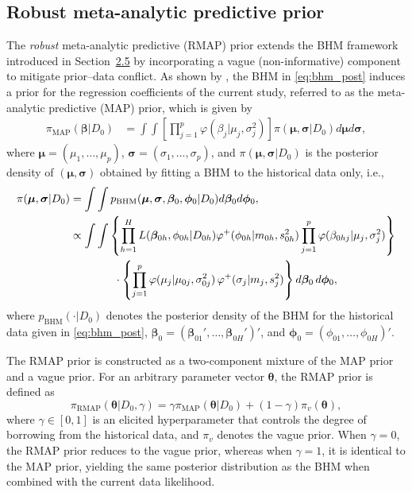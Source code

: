 \subsection{Robust meta-analytic predictive prior}
\label{sec:RMAP}

The \emph{robust} meta-analytic predictive (RMAP) prior \citep{schmidli2014robust} extends the BHM framework introduced in Section~\hyperref[sec:bhm]{2.5} by incorporating a vague (non-informative) component to mitigate prior–data conflict. As shown by \citet{schmidli2014robust}, the BHM in \eqref{eq:bhm_post} induces a prior for the regression coefficients of the current study, referred to as the meta-analytic predictive (MAP) prior, which is given by
\begin{align}
    \pi_{\text{MAP}}(\bm{\beta} | D_0)
        &= \int \int \left[\prod_{j=1}^p \varphi(\beta_j | \mu_j, \sigma_j^2) \right] \pi(\bm{\mu}, \bm{\sigma} | D_0) d\bm{\mu} d\bm{\sigma},
        \label{eq:map}
\end{align}
where $\bm{\mu} = (\mu_1, \ldots, \mu_p)$, $\bm{\sigma} = (\sigma_1, \ldots, \sigma_p)$, and $\pi(\bm{\mu}, \bm{\sigma} | D_0)$ is the posterior density of $(\bm{\mu}, \bm{\sigma})$ obtained by fitting a BHM to the historical data only, i.e.,
\begin{align}
    \pi(\bm{\mu}, \bm{\sigma} | D_0) &= 
    \int \int p_{\text{BHM}}(\bm{\mu}, \bm{\sigma}, \bm{\beta}_0, \bm{\phi}_0 | D_0) d\bm{\beta}_0 d\bm{\phi}_0
    ,\notag \\
    &\propto \int \int \left\{\prod_{h=1}^H L(\bm{\beta}_{0h}, \phi_{0h} | D_{0h}) \varphi^+(\phi_{0h} | m_{0h}, s_{0h}^2) \prod_{j=1}^p \varphi(\beta_{0hj} | \mu_j, \sigma_j^2)
    \right\}
    \notag\\
    &\qquad\qquad \cdot
    \left\{\prod_{j=1}^p
      \varphi(\mu_j | \mu_{0j}, \sigma_{0j}^2)\,
      \varphi^+(\sigma_j | m_j, s_j^2)
    \right\} d\bm{\beta}_0\, d\bm{\phi}_0,
    \label{eq:map_mean_sd}
\end{align}
where $p_{\text{BHM}}(\cdot | D_0)$ denotes the posterior density of the BHM for the historical data given in \eqref{eq:bhm_post}, $\bm{\beta}_0 = (\bm{\beta}_{01}', \ldots, \bm{\beta}_{0H}')'$, and $\bm{\phi}_0 = (\phi_{01}, \ldots, \phi_{0H})'$.

The RMAP prior is constructed as a two-component mixture of the MAP prior and a vague prior. For an arbitrary parameter vector $\bm{\theta}$, the RMAP prior is defined as 
$$\pi_{\text{RMAP}}(\bm{\theta} | D_0, \gamma) = \gamma \pi_{\text{MAP}}(\bm{\theta} | D_0) + (1 - \gamma) \pi_{v}(\bm{\theta}),$$
where $\gamma \in [0, 1]$ is an elicited hyperparameter that controls the degree of borrowing from the historical data, and $\pi_v$ denotes the vague prior. When $\gamma = 0$, the RMAP prior reduces to the vague prior, whereas when $\gamma = 1$, it is identical to the MAP prior, yielding the same posterior distribution as the BHM when combined with the current data likelihood.

